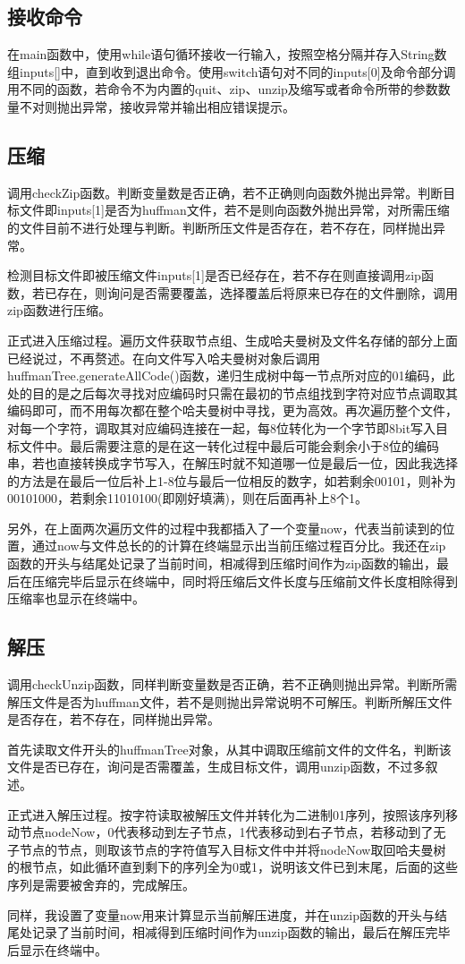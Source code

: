 \documentclass[11pt,a4paper]{article}
\begin{document}
\subsection*{接收命令}
\par{在main函数中，使用while语句循环接收一行输入，按照空格分隔并存入String数组inputs[]中，直到收到退出命令。使用switch语句对不同的inputs[0]及命令部分调用不同的函数，若命令不为内置的quit、zip、unzip及缩写或者命令所带的参数数量不对则抛出异常，接收异常并输出相应错误提示。}
\subsection*{压缩}
\par{调用checkZip函数。判断变量数是否正确，若不正确则向函数外抛出异常。判断目标文件即inputs[1]是否为huffman文件，若不是则向函数外抛出异常，对所需压缩的文件目前不进行处理与判断。判断所压文件是否存在，若不存在，同样抛出异常。}
\par{检测目标文件即被压缩文件inputs[1]是否已经存在，若不存在则直接调用zip函数，若已存在，则询问是否需要覆盖，选择覆盖后将原来已存在的文件删除，调用zip函数进行压缩。}
\par{正式进入压缩过程。遍历文件获取节点组、生成哈夫曼树及文件名存储的部分上面已经说过，不再赘述。在向文件写入哈夫曼树对象后调用huffmanTree.generateAllCode()函数，递归生成树中每一节点所对应的01编码，此处的目的是之后每次寻找对应编码时只需在最初的节点组找到字符对应节点调取其编码即可，而不用每次都在整个哈夫曼树中寻找，更为高效。再次遍历整个文件，对每一个字符，调取其对应编码连接在一起，每8位转化为一个字节即8bit写入目标文件中。最后需要注意的是在这一转化过程中最后可能会剩余小于8位的编码串，若也直接转换成字节写入，在解压时就不知道哪一位是最后一位，因此我选择的方法是在最后一位后补上1-8位与最后一位相反的数字，如若剩余00101，则补为00101000，若剩余11010100(即刚好填满)，则在后面再补上8个1。}
\par{另外，在上面两次遍历文件的过程中我都插入了一个变量now，代表当前读到的位置，通过now与文件总长的的计算在终端显示出当前压缩过程百分比。我还在zip函数的开头与结尾处记录了当前时间，相减得到压缩时间作为zip函数的输出，最后在压缩完毕后显示在终端中，同时将压缩后文件长度与压缩前文件长度相除得到压缩率也显示在终端中。}
\subsection*{解压}
\par{调用checkUnzip函数，同样判断变量数是否正确，若不正确则抛出异常。判断所需解压文件是否为huffman文件，若不是则抛出异常说明不可解压。判断所解压文件是否存在，若不存在，同样抛出异常。}
\par{首先读取文件开头的huffmanTree对象，从其中调取压缩前文件的文件名，判断该文件是否已存在，询问是否需覆盖，生成目标文件，调用unzip函数，不过多叙述。}
\par{正式进入解压过程。按字符读取被解压文件并转化为二进制01序列，按照该序列移动节点nodeNow，0代表移动到左子节点，1代表移动到右子节点，若移动到了无子节点的节点，则取该节点的字符值写入目标文件中并将nodeNow取回哈夫曼树的根节点，如此循环直到剩下的序列全为0或1，说明该文件已到末尾，后面的这些序列是需要被舍弃的，完成解压。}
\par{同样，我设置了变量now用来计算显示当前解压进度，并在unzip函数的开头与结尾处记录了当前时间，相减得到压缩时间作为unzip函数的输出，最后在解压完毕后显示在终端中。}
\end{document}
